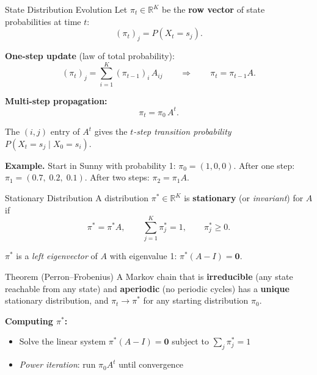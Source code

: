 \documentclass[aspectratio=169,t]{beamer}
\begin{document}
\begin{frame}{State Distribution Evolution}
  Let $\pi_t \in \mathbb{R}^K$ be the \textbf{row vector} of state probabilities at time $t$:
  $$(\pi_t)_j = P(X_t = s_j).$$

  \textbf{One-step update} (law of total probability):
  $$(\pi_t)_j = \sum_{i=1}^K (\pi_{t-1})_i\, A_{ij}
    \qquad\Longrightarrow\qquad
    \pi_t = \pi_{t-1} A.$$

  \textbf{Multi-step propagation:}
  $$\pi_t = \pi_0\, A^t.$$

  The $(i,j)$ entry of $A^t$ gives the \emph{$t$-step transition probability}
  $P(X_t = s_j \mid X_0 = s_i)$.

  \vspace{0.25cm}
  \textbf{Example.} Start in Sunny with probability 1: $\pi_0 = (1, 0, 0)$.
  After one step: $\pi_1 = (0.7,\;0.2,\;0.1)$.
  After two steps: $\pi_2 = \pi_1 A$.
\end{frame}

\begin{frame}{Stationary Distribution}
  A distribution $\pi^* \in \mathbb{R}^K$ is \textbf{stationary} (or \emph{invariant}) for $A$ if
  $$\pi^* = \pi^* A, \qquad \sum_{j=1}^K \pi^*_j = 1, \qquad \pi^*_j \geq 0.$$

  $\pi^*$ is a \emph{left eigenvector} of $A$ with eigenvalue 1: $\pi^*(A - I) = \mathbf{0}$.

  \begin{block}{Theorem (Perron--Frobenius)}
    A Markov chain that is \textbf{irreducible} (any state reachable from any state) and
    \textbf{aperiodic} (no periodic cycles) has a \textbf{unique} stationary distribution,
    and $\pi_t \to \pi^*$ for any starting distribution $\pi_0$.
  \end{block}
  \vspace{0.2cm}
  \textbf{Computing $\pi^*$:}
  \begin{itemize}
    \item Solve the linear system $\pi^*(A - I) = \mathbf{0}$ subject to $\sum_j \pi^*_j = 1$
    \item \emph{Power iteration}: run $\pi_0 A^t$ until convergence
  \end{itemize}
\end{frame}
\end{document}
